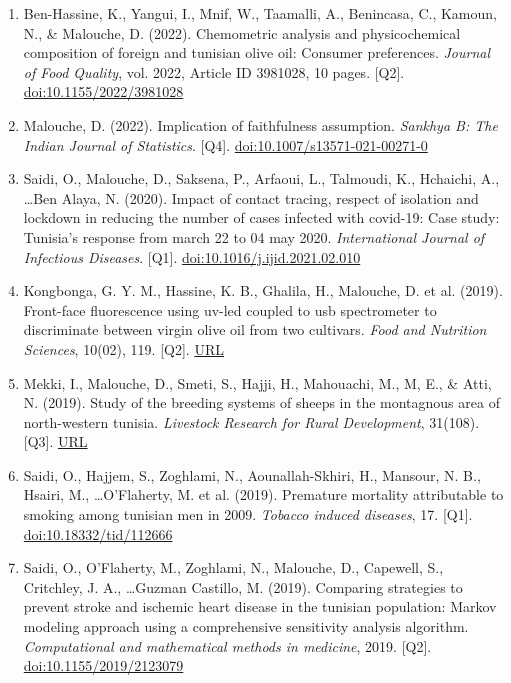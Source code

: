 \documentclass[11pt,a4paper,sans]{moderncv}
\begin{document}
\begin{enumerate}
\item Ben-Hassine, K., Yangui, I., Mnif, W., Taamalli, A., Benincasa, C., Kamoun, N., \& Malouche, D. (2022). Chemometric analysis and physicochemical composition of foreign and tunisian olive oil: Consumer preferences. \textit{Journal of Food Quality}, vol. 2022, Article ID 3981028, 10 pages. [Q2]. \href{https://doi.org/10.1155/2022/3981028}{doi:10.1155/2022/3981028}
\item Malouche, D. (2022). Implication of faithfulness assumption. \textit{Sankhya B: The Indian Journal of Statistics}. [Q4]. \href{https://doi.org/10.1007/s13571-021-00271-0}{doi:10.1007/s13571-021-00271-0}
\item Saidi, O., Malouche, D., Saksena, P., Arfaoui, L., Talmoudi, K., Hchaichi, A., \ldots Ben Alaya, N. (2020). Impact of contact tracing, respect of isolation and lockdown in reducing the number of cases infected with covid-19: Case study: Tunisia's response from march 22 to 04 may 2020. \textit{International Journal of Infectious Diseases}. [Q1]. \href{https://doi.org/10.1016/j.ijid.2021.02.010}{doi:10.1016/j.ijid.2021.02.010}
\item Kongbonga, G. Y. M., Hassine, K. B., Ghalila, H., Malouche, D. et al. (2019). Front-face fluorescence using uv-led coupled to usb spectrometer to discriminate between virgin olive oil from two cultivars. \textit{Food and Nutrition Sciences}, 10(02), 119. [Q2]. \href{http://www.scirp.org/journal/PaperInformation.aspx?PaperID=90405&#abstract}{URL}
\item Mekki, I., Malouche, D., Smeti, S., Hajji, H., Mahouachi, M., M, E., \& Atti, N. (2019). Study of the breeding systems of sheeps in the montagnous area of north-western tunisia. \textit{Livestock Research for Rural Development}, 31(108). [Q3]. \href{http://www.lrrd.org/lrrd31/7/ilyes31108.html}{URL}
\item Saidi, O., Hajjem, S., Zoghlami, N., Aounallah-Skhiri, H., Mansour, N. B., Hsairi, M., \ldots O'Flaherty, M. et al. (2019). Premature mortality attributable to smoking among tunisian men in 2009. \textit{Tobacco induced diseases}, 17. [Q1]. \href{https://dx.doi.org/10.18332%2Ftid%2F112666}{doi:10.18332/tid/112666}
\item Saidi, O., O'Flaherty, M., Zoghlami, N., Malouche, D., Capewell, S., Critchley, J. A., \ldots Guzman Castillo, M. (2019). Comparing strategies to prevent stroke and ischemic heart disease in the tunisian population: Markov modeling approach using a comprehensive sensitivity analysis algorithm. \textit{Computational and mathematical methods in medicine}, 2019. [Q2]. \href{https://doi.org/10.1155/2019/2123079}{doi:10.1155/2019/2123079}

\end{enumerate}
\end{document}
